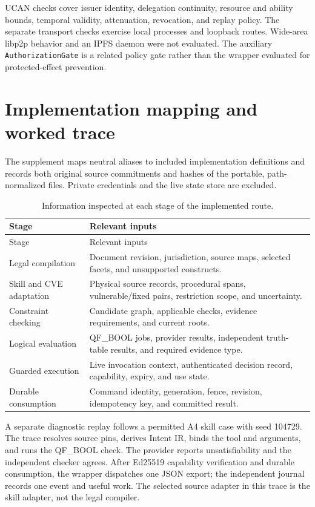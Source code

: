 UCAN checks cover issuer identity, delegation continuity, resource and ability bounds, temporal validity, attenuation, revocation, and replay policy. The separate transport checks exercise local processes and loopback routes. Wide-area libp2p behavior and an IPFS daemon were not evaluated. The auxiliary \texttt{AuthorizationGate} is a related policy gate rather than the wrapper evaluated for protected-effect prevention.

\section{Implementation mapping and worked trace}
\label{app:trace}
\setcounter{table}{0}

The supplement maps neutral aliases to included implementation definitions and records both original source commitments and hashes of the portable, path-normalized files. Private credentials and the live state store are excluded.

\begin{longtable}{@{}>{\raggedright\arraybackslash}p{.25\linewidth} >{\raggedright\arraybackslash}p{.69\linewidth}@{}}
\caption{Information inspected at each stage of the implemented route.}\label{tab:D1}\\
\toprule
Stage & Relevant inputs \\
\midrule
\endfirsthead
\toprule
Stage & Relevant inputs \\
\midrule
\endhead
\bottomrule
\endlastfoot
Legal compilation & Document revision, jurisdiction, source maps, selected facets, and unsupported constructs. \\[4pt]
Skill and CVE adaptation & Physical source records, procedural spans, vulnerable/fixed pairs, restriction scope, and uncertainty. \\[4pt]
Constraint checking & Candidate graph, applicable checks, evidence requirements, and current roots. \\[4pt]
Logical evaluation & QF\_BOOL jobs, provider results, independent truth-table results, and required evidence type. \\[4pt]
Guarded execution & Live invocation context, authenticated decision record, capability, expiry, and use state. \\[4pt]
Durable consumption & Command identity, generation, fence, revision, idempotency key, and committed result. \\
\end{longtable}

A separate diagnostic replay follows a permitted A4 skill case with seed 104729. The trace resolves source pins, derives Intent IR, binds the tool and arguments, and runs the QF\_BOOL check. The provider reports unsatisfiability and the independent checker agrees. After Ed25519 capability verification and durable consumption, the wrapper dispatches one JSON export; the independent journal records one event and useful work. The selected source adapter in this trace is the skill adapter, not the legal compiler.

